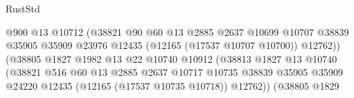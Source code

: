 \begin{lexlean}{RustStd}
\begin{coremodule}
                                                @900
                                                @13
                                                @10712
                                                (@38821
                                                  @90
                                                  @60
                                                  @13
                                                  @2885
                                                  @2637
                                                  @10699
                                                  @10707
                                                  @38839
                                                  @35905
                                                  @35909
                                                  @23976
                                                  @12435
                                                  (@12165 (@17537 @10707 @10700))
                                                  @12762))
                                              (@38805
                                                @1827
                                                @1982
                                                @13
                                                @22
                                                @10740
                                                @10912
                                                (@38813
                                                  @1827
                                                  @13
                                                  @10740
                                                  (@38821
                                                    @516
                                                    @60
                                                    @13
                                                    @2885
                                                    @2637
                                                    @10717
                                                    @10735
                                                    @38839
                                                    @35905
                                                    @35909
                                                    @24220
                                                    @12435
                                                    (@12165 (@17537 @10735 @10718))
                                                    @12762))
                                                (@38805
                                                  @1829

\end{coremodule}
\end{lexlean}
